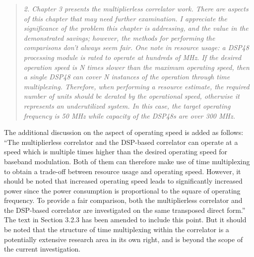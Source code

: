 \documentclass{article}
\begin{document}
\begin{quote}
\emph{2. Chapter 3 presents the multiplierless correlator work. There are aspects of this chapter that may need further examination. I appreciate the significance of the problem this chapter is addressing, and the value in the demonstrated savings; however, the methods for performing the comparisons don't always seem fair.
One note in resource usage: a DSP48 processing module is rated to operate at hundreds of MHz. If the desired operation speed is N times slower than the maximum operating speed, then a single DSP48 can cover N instances of the operation through time multiplexing. Therefore, when performing a resource estimate, the required number of units should be derated by the operational speed, otherwise it represents an underutilized system. In this case, the target operating frequency is 50 MHz while capacity of the DSP48s are over 300 MHz.	}
\end{quote}
The additional discussion on the aspect of operating speed is added as follows:
``The multiplierless correlator and the DSP-based correlator can operate at a speed which is multiple times higher than the desired operating speed for baseband modulation. Both of them can therefore make use of time multiplexing to obtain a trade-off between resource usage and operating speed. However, it should be noted that increased operating speed leads to significantly increased power since the power consumption is proportional to the square of operating frequency. To provide a fair comparison, both the multiplierless correlator and the DSP-based correlator are investigated on the same transposed direct form.''
The text in Section 3.2.3 has been amended to include this point.  But it should be noted that the structure of time multiplexing within the correlator is a potentially extensive research area in its own right, and is beyond the scope of the current investigation.
\end{document}
